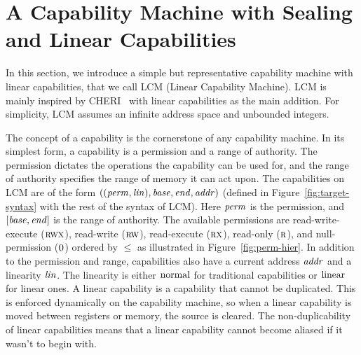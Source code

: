 \documentclass[acmsmall,screen]{acmart}\settopmatter{}
\newcommand{\trgcm}{\textsc{LCM}}
\begin{document}
\section{A Capability Machine with Sealing and Linear Capabilities}
\label{sec:cap-mach-w-seal-and-lin}
In this section, we introduce a simple but representative capability machine with linear capabilities, that we call \trgcm{} (Linear Capability Machine).
\trgcm{} is mainly inspired by CHERI~\citep{watson_cheri_2015} with linear capabilities as the main addition.
For simplicity, \trgcm{} assumes an infinite address space and unbounded integers.

The concept of a capability is the cornerstone of any capability machine.
In its simplest form, a capability is a permission and a range of authority.
The permission dictates the operations the capability can be used for, and the range of authority specifies the range of memory it can act upon.
The capabilities on \trgcm{} are of the form $((\mathit{perm},\mathit{lin}),\mathit{base},\mathit{end},\mathit{addr})$ (defined in Figure~\ref{fig:target-syntax} with the rest of the syntax of \trgcm{}). Here $\mathit{perm}$ is the permission, and $[\mathit{base},\mathit{end}]$ is the range of authority.
The available permissions are read-write-execute ($\textsc{rwx}$), read-write ($\textsc{rw}$), read-execute ($\textsc{rx}$), read-only ($\textsc{r}$), and null-permission ($\textsc{0}$) ordered by $\le$ as illustrated in Figure~\ref{fig:perm-hier}.
In addition to the permission and range, capabilities also have a current address $\mathit{addr}$ and a linearity $\mathit{lin}$.
The linearity is either $\mathrm{normal}$ for traditional capabilities or $\mathrm{linear}$ for linear ones.
A linear capability is a capability that cannot be duplicated.
This is enforced dynamically on the capability machine, so when a linear capability is moved between registers or memory, the source is cleared.
The non-duplicability of linear capabilities means that a linear capability cannot become aliased if it wasn't to begin with.
\end{document}
